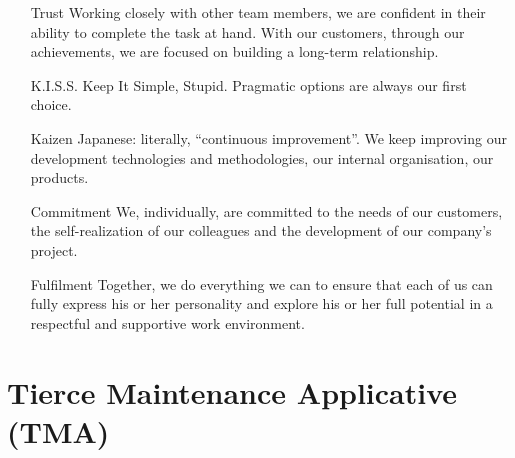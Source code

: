 \documentclass[11pt,twoside,a4paper]{article}
\begin{document}
\begin{landscape}
\begin{multicols}{2}
	\begin{itemize}
		\item[Trust] Working closely with other team members, we are confident in their ability to complete the task at hand. With our customers, through our achievements, we are focused on building a long-term relationship.
		\item[K.I.S.S.] Keep It Simple, Stupid. Pragmatic options are always our first choice.
		\item[Kaizen] Japanese: literally, “continuous improvement”. We keep improving our development technologies and methodologies, our internal organisation, our products.
		\item[Commitment] We, individually, are committed to the needs of our customers, the self-realization of our colleagues and the development of our company’s project.
		\item[Fulfilment] Together, we do everything we can to ensure that each of us can fully express his or her personality and explore his or her full potential in a respectful and supportive work environment.
	\end{itemize}
	
	\vfill
	\columnbreak
	
	\section*{Tierce Maintenance Applicative (TMA)}
	

\end{multicols}
\end{landscape}
\end{document}
